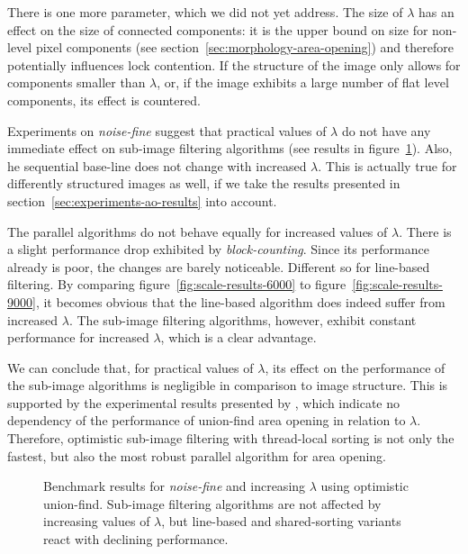 There is one more parameter, which we did not yet address. The size of $\lambda$
has an effect on the size of connected components: it is the upper bound on size
for non-level pixel components (see section~\ref{sec:morphology-area-opening})
and therefore potentially influences lock contention. If the structure of the
image only allows for components smaller than $\lambda$, or, if the image
exhibits a large number of flat level components, its effect is countered.

Experiments on \emph{noise-fine} suggest that practical values of $\lambda$ do
not have any immediate effect on sub-image filtering algorithms (see results in
figure~\ref{fig:scale-results}). Also, he sequential base-line does not change
with increased $\lambda$. This is actually true for differently structured
images as well, if we take the results presented in
section~\ref{sec:experiments-ao-results} into account.

The parallel algorithms do not behave equally for increased values of
$\lambda$. There is a slight performance drop exhibited by
\emph{block-counting}. Since its performance already is poor, the changes are
barely noticeable. Different so for line-based filtering. By comparing
figure~\ref{fig:scale-results-6000} to figure~\ref{fig:scale-results-9000}, it
becomes obvious that the line-based algorithm does indeed suffer from increased
$\lambda$. The sub-image filtering algorithms, however, exhibit constant
performance for increased $\lambda$, which is a clear advantage.

We can conclude that, for practical values of $\lambda$, its effect on the
performance of the sub-image algorithms is negligible in comparison to image
structure. This is supported by the experimental results presented by
\citet{Meijster2002Comparison}, which indicate no dependency of the performance
of union-find area opening in relation to $\lambda$. Therefore, optimistic
sub-image filtering with thread-local sorting is not only the fastest, but also
the most robust parallel algorithm for area opening.

\begin{figure}
  \centering
  \caption[Benchmark results for \emph{noise-fine} and increasing $\lambda$
  using optimistic union-find.]{Benchmark results for \emph{noise-fine} and
    increasing $\lambda$ using optimistic union-find. Sub-image filtering
    algorithms are not affected by increasing values of $\lambda$, but
    line-based and shared-sorting variants react with declining performance.}
  \label{fig:scale-results}
\end{figure}

